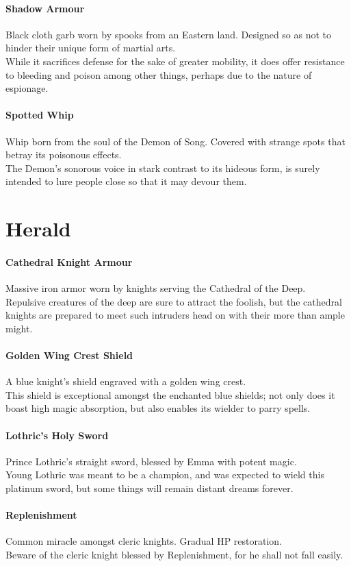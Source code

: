 \documentclass[twocolumn,a4paper]{article}
\begin{document}
\paragraph{Shadow Armour}
Black cloth garb worn by spooks from an Eastern land. Designed so as not to hinder their unique form of martial arts.\\
While it sacrifices defense for the sake of greater mobility, it does offer resistance to bleeding and poison among other things, perhaps due to the nature of espionage.
\paragraph{Spotted Whip}
Whip born from the soul of the Demon of Song. Covered with strange spots that betray its poisonous effects.\\
The Demon's sonorous voice in stark contrast to its hideous form, is surely intended to lure people close so that it may devour them.
\newpage %
\section*{Herald}
\paragraph{Cathedral Knight Armour}
Massive iron armor worn by knights serving the Cathedral of the Deep.\\
Repulsive creatures of the deep are sure to attract the foolish, but the cathedral knights are prepared to meet such intruders head on with their more than ample might.
\paragraph{Golden Wing Crest Shield}
A blue knight's shield engraved with a golden wing crest.\\
This shield is exceptional amongst the enchanted blue shields; not only does it boast high magic absorption, but also enables its wielder to parry spells.
\paragraph{Lothric's Holy Sword}
Prince Lothric's straight sword, blessed by Emma with potent magic.\\
Young Lothric was meant to be a champion, and was expected to wield this platinum sword, but some things will remain distant dreams forever.
\paragraph{Replenishment}
Common miracle amongst cleric knights. Gradual HP restoration.\\
Beware of the cleric knight blessed by Replenishment, for he shall not fall easily.
\end{document}
